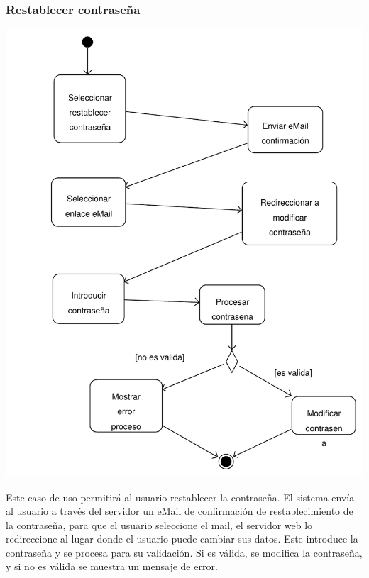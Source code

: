 \documentclass[11pt, a4paper, twoside, titlepage]{article}
\begin{document}
			\subsubsection{Restablecer contraseña}
				\begin{center}
					\includegraphics[scale=.8]{analisis/diagramas/da_restablecercontrasena.pdf}
				\end{center}
				Este caso de uso permitirá al usuario restablecer la contraseña. El sistema envía al usuario a través del servidor un eMail de confirmación de restablecimiento de la contraseña, para que el usuario seleccione el mail, el servidor web lo redireccione al lugar donde el usuario puede cambiar sus datos. Este introduce la contraseña y se procesa para su validación. Si es válida, se modifica la contraseña, y si no es válida se muestra un mensaje de error.
				
\end{document}
